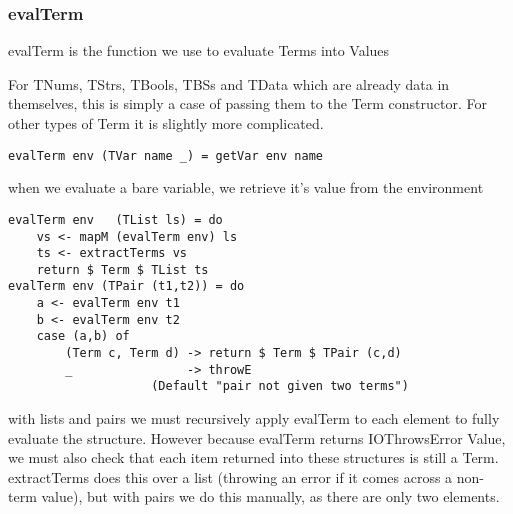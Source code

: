 \subsubsection{evalTerm}

evalTerm is the function we use to evaluate Terms into Values

For TNums, TStrs, TBools, TBSs and TData which are already data in themselves, this is simply a case of passing them to the Term constructor. For other types of Term it is slightly more complicated.
\begin{verbatim}
evalTerm env (TVar name _) = getVar env name
\end{verbatim}
when we evaluate a bare variable, we retrieve it's value from the environment

\begin{verbatim}
evalTerm env   (TList ls) = do
    vs <- mapM (evalTerm env) ls
    ts <- extractTerms vs
    return $ Term $ TList ts
evalTerm env (TPair (t1,t2)) = do
    a <- evalTerm env t1
    b <- evalTerm env t2
    case (a,b) of 
        (Term c, Term d) -> return $ Term $ TPair (c,d)
        _                -> throwE
                    (Default "pair not given two terms")
\end{verbatim}
with lists and pairs we must recursively apply evalTerm to each element to fully evaluate the structure. However because evalTerm returns IOThrowsError Value, we must also check that each item returned into these structures is still a Term. extractTerms does this over a list (throwing an error if it comes across a non-term value), but with pairs we do this manually, as there are only two elements. 

